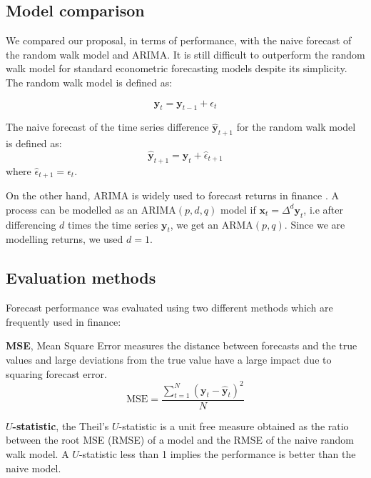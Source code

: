 \subsection{Model comparison} \label{sec:random}
We compared our proposal, in terms of performance, with the naive forecast of the random walk model and ARIMA. It is still difficult to outperform the random walk model for standard econometric forecasting models \cite{lo2011} despite its simplicity. The random walk model is defined as:

\begin{equation}
\mathbf{y}_t = \mathbf{y}_{t-1} + \epsilon_{t}
\label{rwmodel}
\end{equation}

The naive forecast of the time series difference $\hat{\mathbf{y}}_{t+1}$ for the random walk model is defined as:
\begin{equation}
\hat{\mathbf{y}}_{t+1} = \mathbf{y}_t + \hat{\epsilon}_{t+1} 
\end{equation}
\noindent where  $\hat{\epsilon}_{t+1} = \epsilon_{t}$.

On the other hand, ARIMA is widely used to forecast returns in finance \cite{tsay2005}. A process can be modelled as an ARIMA$(p,d,q)$ model if $\mathbf{x}_t=\Delta^d \mathbf{y}_t $, i.e after differencing $d$ times the time series $\mathbf{y}_t$,  we get an ARMA$(p,q)$. Since we are modelling returns, we used $d=1$.


\subsection{Evaluation methods} \label{sec:evaluation}

Forecast performance was evaluated using two different methods which are frequently used in finance:
\begin{description}
\item
{\bf MSE},  Mean Square Error measures the distance between forecasts
and the true values and large deviations from the true value have a
large impact due to squaring forecast error.
\begin{equation}\label{eq:MSE}
\text{MSE} = 
\frac{\displaystyle \sum_{t=1}^{N} (\mathbf{y}_t-\hat{\mathbf{y}}_t)^2}{N}
\end{equation}
\item {\bf $U$-statistic}, the Theil's $U$-statistic \cite{theil1966} is a unit free measure obtained as the ratio between the root MSE (RMSE) of a model and the RMSE of the naive random walk model. A $U$-statistic less than 1 implies the performance is better than the naive model.
\end{description}


